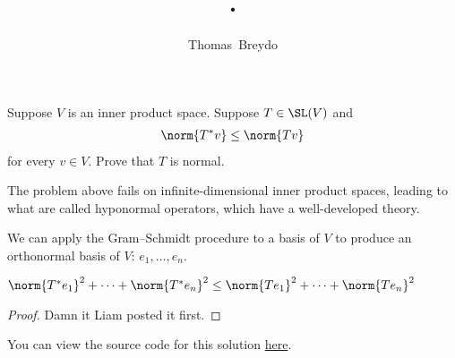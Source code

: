 \documentclass{amsart}
\title{\pagenum.\probnum}
\author{Thomas\ Breydo}
\newcommand{\pagenum}{306}
\newcommand{\probnum}{21}
\begin{document}
\maketitle

\begin{problem*}
Suppose $V$ is an inner product space. Suppose $T\in\SL(V)$ and
\begin{align*}
    \norm{T^*v}\le\norm{Tv}
\end{align*}
for every $v\in V.$ Prove that $T$ is normal.
\end{problem*}
\begin{note*}
The problem above fails on infinite-dimensional inner
product spaces, leading to what are called hyponormal operators,
which have a well-developed theory.
\end{note*}

\vspace{0.5in}

We can apply the Gram--Schmidt procedure to a basis of $V$ to produce
an orthonormal basis of $V$: $e_1,\ldots,e_n.$
\begin{claim*}
$\norm{T^*e_1}^2+\cdots+\norm{T^*e_n}^2\le\norm{Te_1}^2+\cdots+\norm{Te_n}^2$
\end{claim*}
\begin{proof}
Damn it Liam posted it first.
\end{proof}

\vspace{0.5in}

\begin{note*}
You can view the source code for this solution
\href{https://github.com/thomasbreydo/linalg/blob/main/\pagenum_\probnum_Thomas_Breydo.tex}
{here}.
\end{note*}
\end{document}
